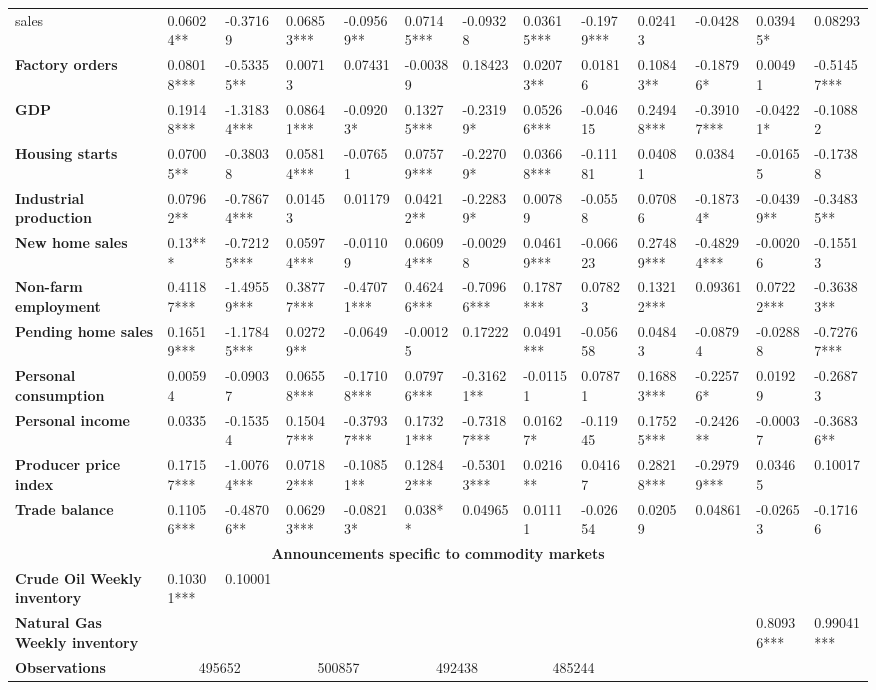 \begin{sidewaystable}
{\begin{tabular}{@{}lllllllllllll@{}}
sales}& 0.06024** & -0.37169 & 0.06853*** & -0.09569** & 0.07145*** & -0.09328 & 0.03615*** & -0.1979*** & 0.02413 & -0.0428 & 0.03945* & 0.08293 \\ \textbf{Factory orders}& 0.08018*** & -0.53355** & 0.00713 & 0.07431 & -0.00389 & 0.18423 & 0.02073** & 0.01816 & 0.10843** & -0.18796* & 0.00491 & -0.51457*** \\ \textbf{GDP}& 0.19148*** & -1.31834*** & 0.08641*** & -0.09203* & 0.13275*** & -0.23199* & 0.05266*** & -0.04615 & 0.24948*** & -0.39107*** & -0.04221* & -0.10882 \\ \textbf{Housing starts}& 0.07005** & -0.38038 & 0.05814*** & -0.07651 & 0.07579*** & -0.22709* & 0.03668*** & -0.11181 & 0.04081 & 0.0384 & -0.01655 & -0.17388 \\ \textbf{Industrial production}& 0.07962** & -0.78674*** & 0.01453 & 0.01179 & 0.04212** & -0.22839* & 0.00789 & -0.0558 & 0.07086 & -0.18734* & -0.04399** & -0.34835** \\ \textbf{New home sales}& 0.13*** & -0.72125*** & 0.05974*** & -0.01109 & 0.06094*** & -0.00298 & 0.04619*** & -0.06623 & 0.27489*** & -0.48294*** & -0.00206 & -0.15513 \\ \textbf{Non-farm employment}& 0.41187*** & -1.49559*** & 0.38777*** & -0.47071*** & 0.46246*** & -0.70966*** & 0.1787*** & 0.07823 & 0.13212*** & 0.09361 & 0.07222*** & -0.36383** \\ \textbf{Pending home sales}& 0.16519*** & -1.17845*** & 0.02729** & -0.0649 & -0.00125 & 0.17222 & 0.0491*** & -0.05658 & 0.04843 & -0.08794 & -0.02888 & -0.72767*** \\ \textbf{Personal consumption}& 0.00594 & -0.09037 & 0.06558*** & -0.17108*** & 0.07976*** & -0.31621** & -0.01151 & 0.07871 & 0.16883*** & -0.22576* & 0.01929 & -0.26873 \\ \textbf{Personal income}& 0.0335 & -0.15354 & 0.15047*** & -0.37937*** & 0.17321*** & -0.73187*** & 0.01627* & -0.11945 & 0.17525*** & -0.2426** & -0.00037 & -0.36836** \\ \textbf{Producer price index}& 0.17157*** & -1.00764*** & 0.07182*** & -0.10851** & 0.12842*** & -0.53013*** & 0.0216** & 0.04167 & 0.28218*** & -0.29799*** & 0.03465 & 0.10017 \\ \textbf{Trade balance}& 0.11056*** & -0.48706** & 0.06293*** & -0.08213* & 0.038** & 0.04965 & 0.01111 & -0.02654 & 0.02059 & 0.04861 & -0.02653 & -0.17166 \\  \midrule \multicolumn{13}{c}{\textbf{Announcements specific to commodity markets}} \\ \midrule \textbf{Crude Oil Weekly inventory}& 0.10301*** & 0.10001 &  &  &  &  &  &  &  &  &  &  \\ \textbf{Natural Gas Weekly inventory}&  &  &  &  &  &  &  &  &  &  & 0.80936*** & 0.99041*** \\  \midrule \textbf{Observations}             &\multicolumn{2}{c}{ 495652 }                                                 & \multicolumn{2}{c}{ 500857 }                                                 & \multicolumn{2}{c}{ 492438 }                                                 & \multicolumn{2}{c}{ 485244 }                                                 & 
\end{tabular}}
\end{sidewaystable}
